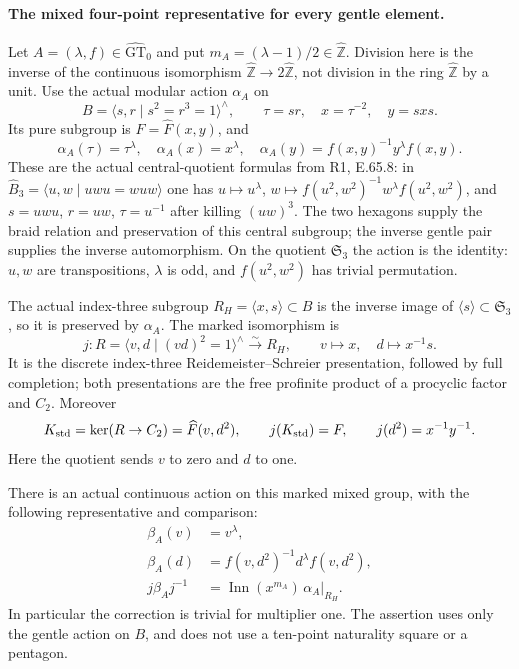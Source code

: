 \paragraph{The mixed four-point representative for every gentle element.}
Let $A=(\lambda,f)\in\widehat{\mathrm{GT}}_0$ and put
$m_A=(\lambda-1)/2\in\widehat{\mathbb Z}$.
Division here is the inverse of the continuous isomorphism
$\widehat{\mathbb Z}\to2\widehat{\mathbb Z}$, not division
in the ring $\widehat{\mathbb Z}$ by a unit.
Use the actual modular action $\alpha_A$ on
\[
 B=\langle s,r\mid s^2=r^3=1\rangle^{\wedge},\qquad
 \tau=sr,\quad x=\tau^{-2},\quad y=sxs.
\]
Its pure subgroup is $F=\widehat F(x,y)$, and
\[
 \alpha_A(\tau)=\tau^\lambda,\quad
 \alpha_A(x)=x^\lambda,\quad
 \alpha_A(y)=f(x,y)^{-1}y^\lambda f(x,y).
\]
These are the actual central-quotient formulas from R1,
E.65.8: in $\widehat B_3=\langle u,w\mid uwu=wuw\rangle$
one has $u\mapsto u^\lambda$,
$w\mapsto f(u^2,w^2)^{-1}w^\lambda f(u^2,w^2)$,
and $s=uwu$, $r=uw$, $\tau=u^{-1}$ after killing
$(uw)^3$.  The two hexagons supply the braid relation
and preservation of this central subgroup; the inverse
gentle pair supplies the inverse automorphism.
On the quotient $\mathfrak S_3$ the action is the identity:
$u,w$ are transpositions, $\lambda$ is odd, and
$f(u^2,w^2)$ has trivial permutation.

The actual index-three subgroup
$R_H=\langle x,s\rangle\subset B$ is the inverse image
of $\langle s\rangle\subset\mathfrak S_3$, so it is
preserved by $\alpha_A$.  The marked isomorphism is
\[
 j:R=\langle v,d\mid(vd)^2=1\rangle^{\wedge}
       \xrightarrow{\sim}R_H,\qquad
       v\mapsto x,\quad d\mapsto x^{-1}s.
\]
It is the discrete index-three Reidemeister--Schreier
presentation, followed by full completion; both presentations
are the free profinite product of a procyclic factor and
$C_2$.  Moreover
\[
 K_{\rm std}=\ker(R\to C_2)=\widehat F(v,d^2),\qquad
 j(K_{\rm std})=F,\qquad
 j(d^2)=x^{-1}y^{-1}.
\]
Here the quotient sends $v$ to zero and $d$ to one.

There is an actual continuous action on this marked mixed
group, with the following representative and comparison:
\[
 \begin{aligned}
 \beta_A(v)&=v^\lambda,\\
 \beta_A(d)&=f(v,d^2)^{-1}d^\lambda f(v,d^2),\\
 j\beta_Aj^{-1}
     &=\operatorname{Inn}(x^{m_A})\,
                     \alpha_A|_{R_H}.
 \end{aligned}
\]
In particular the correction is trivial for multiplier one.
The assertion uses only the gentle action on $B$, and does
not use a ten-point naturality square or a pentagon.

